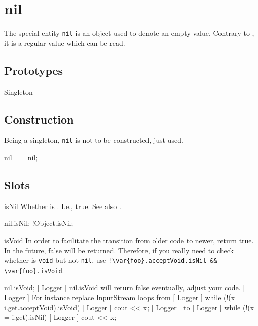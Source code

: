 
\section{nil}

The special entity \lstinline|nil| is an object used to denote an
empty value.  Contrary to , it is a regular value
which can be read.

\subsection{Prototypes}

\begin{refObjects}
\item[Singleton]
\end{refObjects}

\subsection{Construction}

Being a singleton, \lstinline|nil| is not to be constructed, just used.

\begin{urbiassert}[firstnumber=1]
nil == nil;
\end{urbiassert}

\subsection{Slots}

\begin{urbiscriptapi}
\item[isNil] Whether \this is .  I.e., true.  See also
  .
\begin{urbiassert}
nil.isNil;
!Object.isNil;
\end{urbiassert}

\item[isVoid] In order to facilitate the transition from older code to
  newer, return true.  In the future, false will be returned.  Therefore, if
  you really need to check whether  is \lstinline|void| but not
  \lstinline|nil|, use
  \lstinline|!\var{foo}.acceptVoid.isNil && \var{foo}.isVoid|.
\begin{urbiassert}
nil.isVoid;
[     Logger     ] nil.isVoid will return false eventually, adjust your code.
[     Logger     ]     For instance replace InputStream loops from
[     Logger     ]       while (!(x = i.get.acceptVoid).isVoid)
[     Logger     ]         cout << x;
[     Logger     ]     to
[     Logger     ]       while (!(x = i.get).isNil)
[     Logger     ]         cout << x;
\end{urbiassert}
\end{urbiscriptapi}


